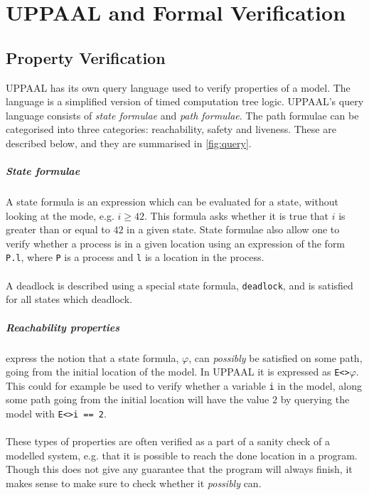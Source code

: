 \chapter{UPPAAL and Formal Verification}
\section{Property Verification}
UPPAAL has its own query language used to verify properties of a model\cite[p. 7]{upptut}. The language is a simplified version of timed computation tree logic. UPPAAL's query language consists of \textit{state formulae} and \textit{path formulae}. The path formulae can be categorised into three categories: reachability, safety and liveness. These are described below, and they are summarised in \cref{fig:query}.
\paragraph{State formulae}
A state formula is an expression which can be evaluated for a state, without looking at the mode, e.g. $i \geq 42$. This formula asks whether it is true that $i$ is greater than or equal to $42$ in a given state. State formulae also allow one to verify whether a process is in a given location using an expression of the form \texttt{P.l}, where \texttt{P} is a process and \texttt{l} is a location in the process.\\\\
A deadlock is described using a special state formula, \texttt{deadlock}, and is satisfied for all states which deadlock.
\paragraph{Reachability properties} express the notion that a state formula, $\varphi$, can \textit{possibly} be satisfied on some path, going from the initial location of the model. In UPPAAL it is expressed as \texttt{E<>$\varphi$}. This could for example be used to verify whether a variable \texttt{i} in the model, along some path going from the initial location will have the value $2$ by querying the model with \texttt{E<>i == 2}.\\\\
These types of properties are often verified as a part of a sanity check of a modelled system\cite[p. 205]{upptut}, e.g. that it is possible to reach the done location in a \jc program. Though this does not give any guarantee that the program will always finish, it makes sense to make sure to check whether it \textit{possibly} can.
